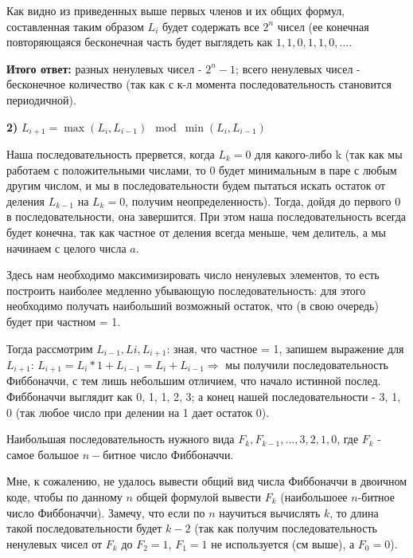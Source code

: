 \documentclass{article}
\begin{document}
\medskip

Как видно из приведенных выше первых членов и их общих формул, составленная таким образом $L_i$ будет содержать все $2^n$ чисел (ее конечная повторяющаяся бесконечная часть будет выглядеть как $1,1,0,1,1,0,...$. 

\textbf{Итого ответ:} разных ненулевых чисел - $2^n - 1$; всего ненулевых чисел - бесконечное количество (так как с к-л момента последовательность становится периодичной).


\bigskip

\textbf{2)} $L_{i+1} = \max(L_i, L_{i-1}) \mod \min(L_i, L_{i-1})$

Наша последовательность прервется, когда $L_k = 0$ для какого-либо k (так как мы работаем с положительными числами, то 0 будет минимальным в паре с любым другим числом, и мы в последовательности будем пытаться искать остаток от деления $L_{k-1}$ на $L_k = 0$, получим неопределенность). Тогда, дойдя до первого 0 в последовательности, она завершится. При этом наша последовательность всегда будет конечна, так как частное от деления всегда меньше, чем делитель, а мы начинаем с целого числа $a$.  

Здесь нам необходимо максимизировать число ненулевых элементов, то есть построить наиболее медленно убывающую последовательность: для этого необходимо получать наибольший возможный остаток, что (в свою очередь) будет при частном = 1.

Тогда рассмотрим $L_{i-1}, Li, L_{i+1}$: зная, что частное = 1, запишем выражение для $L_{i+1}$: $ L_{i+1} = L_i * 1 + L_{i-1} = L_i + L_{i-1} \Rightarrow $ мы получили последовательность Фиббоначчи, с тем лишь небольшим отличием, что начало истинной послед. Фиббоначчи выглядит как 0, 1, 1, 2, 3; а конец нашей последовательности - 3, 1, 0 (так любое число при делении на 1 дает остаток 0).

Наибольшая последовательность нужного вида $F_k, F_{k-1}, ..., 3, 2, 1, 0$, где $F_k$ - самое большое $n-$битное число Фиббоначчи.


Мне, к сожалению, не удалось вывести общий вид числа Фиббоначчи в двоичном коде, чтобы по данному $n$ общей формулой вывести $F_k$ (наибольшоее $n$-битное число Фиббоначчи). Замечу, что если по $n$ научиться вычислять $k$, то длина такой последовательности будет $k-2$ (так как получим последовательность ненулевых чисел от $F_k$ до $F_2 = 1$, $F_1=1$ не используется (см выше), а $F_0 = 0$).
\end{document}
